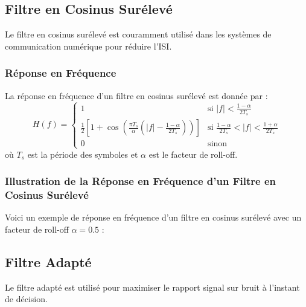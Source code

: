 \documentclass[10pt,a4paper]{article}
\begin{document}
\subsection*{Filtre en Cosinus Surélevé}
Le filtre en cosinus surélevé est couramment utilisé dans les systèmes de communication numérique pour réduire l'ISI.

\subsubsection*{Réponse en Fréquence}
La réponse en fréquence d'un filtre en cosinus surélevé est donnée par :
\[ H(f) = \begin{cases}
1 & \text{si } |f| < \frac{1 - \alpha}{2T_s} \\
\frac{1}{2} \left[1 + \cos\left(\frac{\pi T_s}{\alpha} \left(|f| - \frac{1 - \alpha}{2T_s}\right)\right)\right] & \text{si } \frac{1 - \alpha}{2T_s} < |f| < \frac{1 + \alpha}{2T_s} \\
0 & \text{sinon}
\end{cases} \]
où \( T_s \) est la période des symboles et \( \alpha \) est le facteur de roll-off.

\subsubsection*{Illustration de la Réponse en Fréquence d'un Filtre en Cosinus Surélevé}
Voici un exemple de réponse en fréquence d'un filtre en cosinus surélevé avec un facteur de roll-off \( \alpha = 0.5 \) :


\subsection*{Filtre Adapté}
Le filtre adapté est utilisé pour maximiser le rapport signal sur bruit à l'instant de décision.
\end{document}
